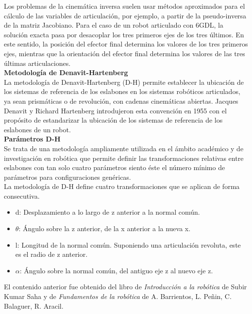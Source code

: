 Los problemas de la cinemática inversa suelen usar métodos aproximados para el cálculo de las variables de articulación, por ejemplo, a partir de la pseudo-inversa de la matriz Jacobiano. Para el caso de un robot articulado con 6GDL, la solución exacta pasa por desacoplar los tres primeros ejes de los tres últimos. En este sentido, la posición del efector final determina los valores de los tres primeros ejes, mientras que la orientación del efector final determina los valores de las tres últimas articulaciones.\\

\textbf{Metodología de Denavit-Hartenberg}\\
La metodología de Denavit-Hartenberg (D-H) permite establecer la ubicación de los sistemas de referencia de los eslabones en los sistemas robóticos articulados, ya sean prismáticas o de revolución, con cadenas cinemáticas abiertas. Jacques Denavit y Richard Hartenberg introdujeron esta convención en 1955 con el propósito de estandarizar la ubicación de los sistemas de referencia de los eslabones de un robot.\\

\newpage
\textbf{Parámetros D-H}\\
Se trata de una metodología ampliamente utilizada en el ámbito académico y de investigación en robótica que permite definir las transformaciones relativas entre eslabones con tan solo cuatro parámetros siento éste el número mínimo de parámetros para configuraciones genéricas.\\


La metodología de D-H define cuatro transformaciones que se aplican de forma consecutiva.
\begin{itemize}
\item d: Desplazamiento a lo largo de z anterior a la normal común.
\item $\theta$: Ángulo sobre la z anterior, de la x anterior a la nueva x.
\item l: Longitud de la normal común. Suponiendo una articulación revoluta, este es el radio de z anterior.
\item $\alpha$: Ángulo sobre la normal común, del antiguo eje z al nuevo eje z.
\end{itemize}

El contenido anterior fue obtenido del libro de \textit{Introducción a la robótica} \cite{saha-2010} de Subir Kumar Saha y de \textit{Fundamentos de la robótica} \cite{barrientos-2007} de A. Barrientos, L. Peñin, C. Balaguer, R. Aracil.\\

